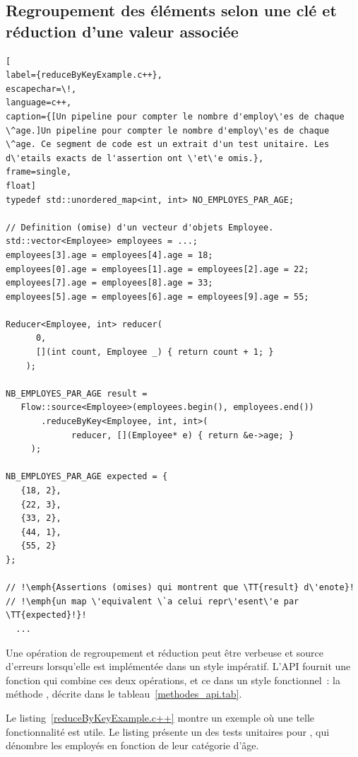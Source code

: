 \subsection{Regroupement des \'el\'ements selon une cl\'e et r\'eduction d'une valeur associ\'ee}

\begin{lstlisting}[
label={reduceByKeyExample.c++},
escapechar=\!,
language=c++,
caption={[Un pipeline pour compter le nombre d'employ\'es de chaque \^age.]Un pipeline pour compter le nombre d'employ\'es de chaque \^age. Ce segment de code est un extrait d'un test unitaire. Les d\'etails exacts de l'assertion ont \'et\'e omis.},
frame=single,
float]
typedef std::unordered_map<int, int> NO_EMPLOYES_PAR_AGE;

// Definition (omise) d'un vecteur d'objets Employee.
std::vector<Employee> employees = ...; 
employees[3].age = employees[4].age = 18;
employees[0].age = employees[1].age = employees[2].age = 22;
employees[7].age = employees[8].age = 33;
employees[5].age = employees[6].age = employees[9].age = 55;

Reducer<Employee, int> reducer(
      0,
      [](int count, Employee _) { return count + 1; }
    );

NB_EMPLOYES_PAR_AGE result = 
   Flow::source<Employee>(employees.begin(), employees.end())
       .reduceByKey<Employee, int, int>(
             reducer, [](Employee* e) { return &e->age; }
     );
    
NB_EMPLOYES_PAR_AGE expected = {
   {18, 2},
   {22, 3},
   {33, 2},
   {44, 1},
   {55, 2}
};

// !\emph{Assertions (omises) qui montrent que \TT{result} d\'enote}!
// !\emph{un map \'equivalent \`a celui repr\'esent\'e par \TT{expected}!}!
  ...
\end{lstlisting}

Une op\'eration de regroupement et r\'eduction peut \^etre verbeuse et source d'erreurs lorsqu'elle est impl\'ement\'ee dans un style imp\'eratif. L'{API} fournit une fonction qui combine ces deux op\'erations, et ce  dans un style fonctionnel~: la m\'ethode , d\'ecrite dans le tableau~\ref{methodes_api.tab}. 

Le listing~\ref{reduceByKeyExample.c++} montre un exemple o\`u une telle fonctionnalit\'e est utile. Le listing pr\'esente un des tests unitaires pour , qui d\'enombre les employ\'es en fonction de leur cat\'egorie d'\^age. 

